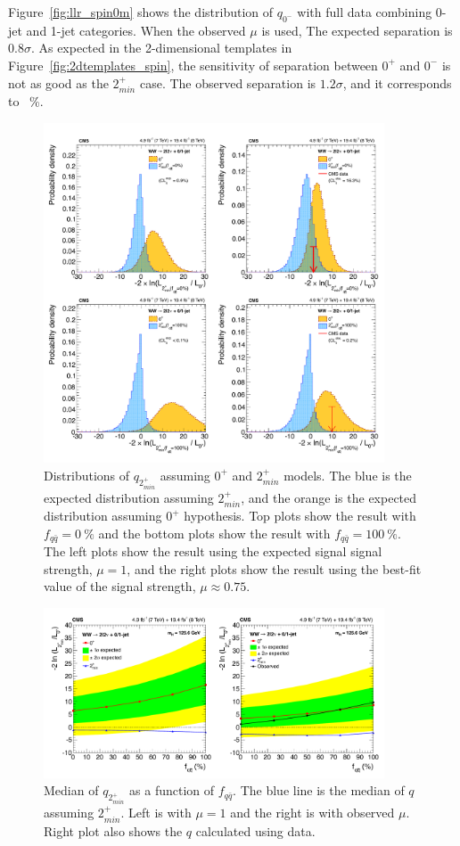 Figure~\ref{fig:llr_spin0m} shows the distribution of $q_{0^-}$ with full data 
combining 0-jet and 1-jet categories. When the observed $\mu$ is used, 
The expected separation is $0.8\sigma$.  
As expected in the 2-dimensional templates in Figure~\ref{fig:2dtemplates_spin},
the sensitivity of separation between $0^+$ and $0^-$ is 
not as good as the $2_{min}^+$ case.
The observed separation is $1.2\sigma$, and it corresponds to ~\%. 

%
\begin{figure}[ht!] 
\centering 
\includegraphics[width=0.9\textwidth]{figures/spin2LLR.pdf}
\caption{Distributions of $q_{2_{min}^+}$ assuming $0^+$ and $2_{min}^+$ models.  
The blue is the expected distribution assuming 
$2_{min}^+$, and the orange is the expected distribution assuming $0^+$ hypothesis.
Top plots show the result with $f_{q\bar{q}}=0~\%$ and the bottom plots show 
the result with $f_{q\bar{q}}=100~\%$. The left plots show the result using the 
expected signal signal strength, $\mu=1$, 
and the right plots show the result using the best-fit value of the signal strength, 
$\mu \approx 0.75$.}  
\label{fig:llr_spin2} 
\end{figure} 
%
\begin{figure}[ht!] 
\centering 
\includegraphics[width=0.9\textwidth]{figures/spinLLRband.pdf}
\caption{Median of $q_{2_{min}^+}$ as a function of $f_{q\bar{q}}$. 
The blue line is the median of $q$ assuming $2_{min}^+$.
Left is with $\mu=1$ and the right is with observed $\mu$.
Right plot also shows the $q$ calculated using data. 
} 
\label{fig:llr_band} 
\end{figure} 
